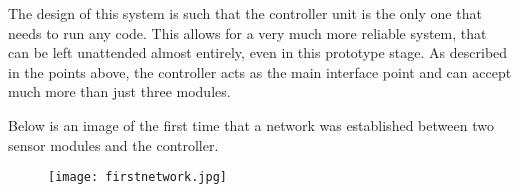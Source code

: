 The design of this system is such that the controller unit is the only one that needs to run any code. This allows for a very much more reliable system, that can be left unattended almost entirely, even in this prototype stage. As described in the points above, the controller acts as the main interface point and can accept much more than just three modules. 

Below is an image of the first time that a network was established between two sensor modules and the controller.

\begin{figure}
  \texttt{[image: firstnetwork.jpg]}
  \label{fig:firstnet}
\end{figure}
\FloatBarrier
\newpage
